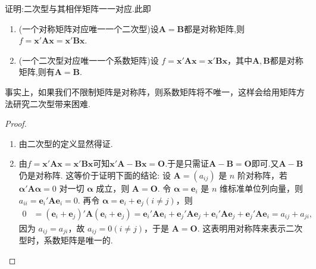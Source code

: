 \documentclass[../../main.tex]{subfiles}
\begin{document}
\begin{theorem}\label{theorem:二次型与其相伴矩阵一一对应}
证明:二次型与其相伴矩阵一一对应.此即
\begin{enumerate}[(1)]
\item (一个对称矩阵对应唯一一个二次型)设$\boldsymbol{A}=\boldsymbol{B}$都是对称矩阵,则$f = \boldsymbol{x}'\boldsymbol{A}\boldsymbol{x}=\boldsymbol{x}'\boldsymbol{B}\boldsymbol{x}$.

\item (一个二次型对应唯一一个系数矩阵)设 $f = \boldsymbol{x}'\boldsymbol{A}\boldsymbol{x}=\boldsymbol{x}'\boldsymbol{B}\boldsymbol{x}$，其中$\boldsymbol{A},\boldsymbol{B}$都是对称矩阵,则有$\boldsymbol{A}=\boldsymbol{B}$. 
\end{enumerate}
\end{theorem}
\begin{remark}
事实上，如果我们不限制矩阵是对称阵，则系数矩阵将不唯一，这样会给用矩阵方法研究二次型带来困难.
\end{remark}
\begin{proof}
\begin{enumerate}[(1)]
\item 由二次型的定义显然得证.

\item 由$f = \boldsymbol{x}'\boldsymbol{A}\boldsymbol{x}=\boldsymbol{x}'\boldsymbol{B}\boldsymbol{x}$可知$\boldsymbol{x}'\boldsymbol{A-B}\boldsymbol{x}=\boldsymbol{O}$.于是只需证$\boldsymbol{A-B}=\boldsymbol{O}$即可.又$\boldsymbol{A-B}$仍是对称阵.
这等价于证明下面的结论: 设 $\boldsymbol{A}=(a_{ij})$ 是 $n$ 阶对称阵，若 $\boldsymbol{\alpha}'\boldsymbol{A}\boldsymbol{\alpha}=0$ 对一切 $\boldsymbol{\alpha}$ 成立，则 $\boldsymbol{A}=\boldsymbol{O}$. 令 $\boldsymbol{\alpha}=\boldsymbol{e}_i$ 是 $n$ 维标准单位列向量，则 $a_{ii}=\boldsymbol{e}_i'\boldsymbol{A}\boldsymbol{e}_i = 0$. 再令 $\boldsymbol{\alpha}=\boldsymbol{e}_i+\boldsymbol{e}_j (i\neq j)$，则
\begin{align*}
0&=(\boldsymbol{e}_i+\boldsymbol{e}_j)'\boldsymbol{A}(\boldsymbol{e}_i+\boldsymbol{e}_j)=\boldsymbol{e}_i'\boldsymbol{A}\boldsymbol{e}_i+\boldsymbol{e}_j'\boldsymbol{A}\boldsymbol{e}_j+\boldsymbol{e}_i'\boldsymbol{A}\boldsymbol{e}_j+\boldsymbol{e}_j'\boldsymbol{A}\boldsymbol{e}_i=a_{ij}+a_{ji},
\end{align*}
因为 $a_{ij}=a_{ji}$，故 $a_{ij}=0 (i\neq j)$，于是 $\boldsymbol{A}=\boldsymbol{O}$. 这表明用对称阵来表示二次型时，系数矩阵是唯一的. 
\end{enumerate}

\end{proof}
\end{document}
